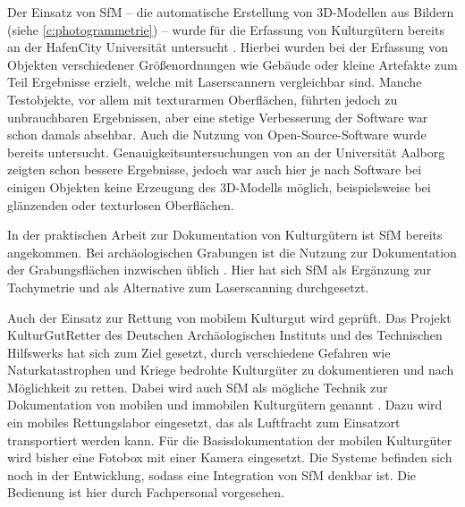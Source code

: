 \documentclass[./00PhotoBox]{subfiles}
\begin{document}
Der Einsatz von \acrfull{SfM} -- die au\-to\-ma\-tische Erstellung von 3D-Modellen aus Bildern (siehe \autoref{c:photogrammetrie}) -- wurde für die Erfassung von Kulturgütern bereits \citeyear{kersten2012} an der HafenCity Universität untersucht \citep[vgl.][]{kersten2012}. Hierbei wurden bei der Erfassung von Objekten verschiedener Größenordnungen wie Gebäude oder kleine Artefakte zum Teil Ergebnisse erzielt, welche mit Laserscannern vergleichbar sind.  Manche Testobjekte, vor allem mit texturarmen Oberflächen, führten jedoch zu unbrauchbaren Ergebnissen, aber eine stetige Verbesserung der Software war schon damals absehbar. Auch die Nutzung von Open-Source-Software wurde bereits untersucht. Genauigkeitsuntersuchungen von \citet{IvanNikolov} an der Universität Aalborg zeigten schon bessere Ergebnisse, jedoch war auch hier je nach Software bei einigen Objekten keine Erzeugung des 3D-Modells möglich, beispielsweise bei glänzenden oder texturlosen Oberflächen.

In der praktischen Arbeit zur Dokumentation von Kulturgütern ist \acrfull{SfM} bereits angekommen. Bei archäologischen Grabungen ist die Nutzung zur Dokumentation der Grabungsflächen inzwischen üblich \citep[vgl.][]{grabungen_sfm}. Hier hat sich \Gls{SfM} als Ergänzung zur Tachymetrie und als Alternative zum Laserscanning durchgesetzt.

Auch der Einsatz zur Rettung von mobilem Kulturgut wird geprüft. Das Projekt KulturGutRetter des Deutschen Archäologischen Instituts und des Technischen Hilfswerks hat sich zum Ziel gesetzt, durch verschiedene Gefahren wie Naturkatastrophen und Kriege bedrohte Kulturgüter zu dokumentieren und nach Möglichkeit zu retten. Dabei wird auch \Gls{SfM} als mögliche Technik zur Dokumentation von mobilen und immobilen Kulturgütern genannt \citep[vgl.][S. 48]{kgr_article}. Dazu wird ein mobiles Rettungslabor eingesetzt, das als Luftfracht zum Einsatzort transportiert werden kann. Für die Basisdokumentation der mobilen Kulturgüter wird bisher eine Fotobox mit einer Kamera eingesetzt. Die Systeme befinden sich noch in der Entwicklung, sodass eine Integration von \Gls{SfM} denkbar ist. Die Bedienung ist hier durch Fachpersonal vorgesehen. \citep[vgl.][]{kulturgutretter}

\biblio
\end{document}

